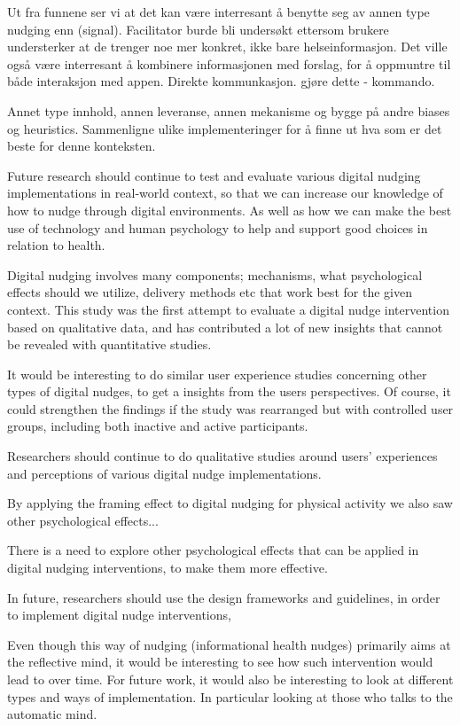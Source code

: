 Ut fra funnene ser vi at det kan være interresant å benytte seg av annen type nudging enn (signal). Facilitator burde bli undersøkt ettersom brukere understerker at de trenger noe mer konkret, ikke bare helseinformasjon. 
Det ville også være interresant å kombinere informasjonen med forslag, for å oppmuntre til både interaksjon med appen. Direkte kommunkasjon. gjøre dette - kommando. 

Annet type innhold, annen leveranse, annen mekanisme og bygge på andre biases og heuristics. 
Sammenligne ulike implementeringer for å finne ut hva som er det beste for denne konteksten. 

Future research should continue to test and evaluate various digital nudging implementations in real-world context, so that we can increase our knowledge of how to nudge through digital environments. As well as how we can make the best use of technology and human psychology to help and support good choices in relation to health. 

Digital nudging involves many components; mechanisms, what psychological effects should we utilize, delivery methods etc that work best for the given context. This study was the first attempt to evaluate a digital nudge intervention based on qualitative data, and has contributed a lot of new insights that cannot be revealed with quantitative studies.

It would be interesting to do similar user experience studies concerning other types of digital nudges, to get a insights from the users perspectives. Of course, it could strengthen the findings if the study was rearranged but with controlled user groups, including both inactive and active participants.   

Researchers should continue to do qualitative studies around users' experiences and perceptions of various digital nudge implementations. 

By applying the framing effect to digital nudging for physical activity we also saw other psychological effects... 

There is a need to explore other psychological effects that can be applied in digital nudging interventions, to make them more effective.

In future, researchers should use the design frameworks and guidelines, in order to implement digital nudge interventions, 

Even though this way of nudging (informational health nudges) primarily aims at the reflective mind, it would be interesting to see how such intervention would lead to over time.  For future work, it would also be interesting to look at different types and ways of implementation. In particular looking at those who talks to the automatic mind. 

